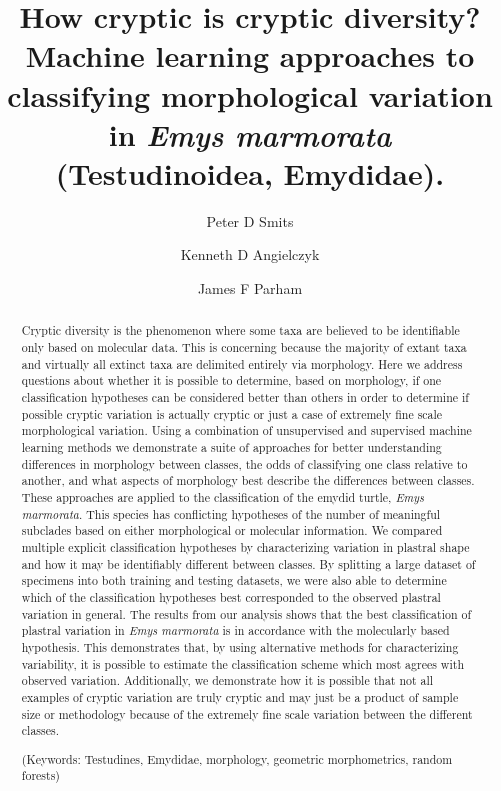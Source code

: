 \documentclass[12pt,letterpaper]{article}\usepackage{graphicx, color}
\title{How cryptic is cryptic diversity? Machine learning approaches to classifying morphological variation in \textit{Emys marmorata} (Testudinoidea, Emydidae).}
\author[1]{Peter D Smits}%
\author[1,2]{Kenneth D Angielczyk}%
\author[3]{James F Parham}%
\affil[1]{Committee on Evolutionary Biology, University of Chicago}
\affil[2]{Integrative Research Center, Field Museum of Natural History}
\affil[3]{Department of Geological Sciences, California State University -- Fullerton}
\begin{document}
\maketitle
{}

\linenumbers
\modulolinenumbers[2]

\begin{abstract}
  Cryptic diversity is the phenomenon where some taxa are believed to be identifiable only based on molecular data. This is concerning because the majority of extant taxa and virtually all extinct taxa are delimited entirely via morphology. Here we address questions about whether it is possible to determine, based on morphology, if one classification hypotheses can be considered better than others in order to determine if possible cryptic variation is actually cryptic or just a case of extremely fine scale morphological variation. %
  Using a combination of unsupervised and supervised machine learning methods we demonstrate a suite of approaches for better understanding differences in morphology between classes, the odds of classifying one class relative to another, and what aspects of morphology best describe the differences between classes.
  These approaches are applied to the classification of the emydid turtle, \textit{Emys marmorata}. This species has conflicting hypotheses of the number of meaningful subclades based on either morphological or molecular information. We compared multiple explicit classification hypotheses by characterizing variation in plastral shape and how it may be identifiably different between classes. By splitting a large dataset of specimens into both training and testing datasets, we were also able to determine which of the classification hypotheses best corresponded to the observed plastral variation in general.
  The results from our analysis shows that the best classification of plastral variation in \textit{Emys marmorata} is in accordance with the molecularly based hypothesis. This demonstrates that, by using alternative methods for characterizing variability, it is possible to estimate the classification scheme which most agrees with observed variation. Additionally, we demonstrate how it is possible that not all examples of cryptic variation are truly cryptic and may just be a product of sample size or methodology because of the extremely fine scale variation between the different classes.
 
\noindent (Keywords: Testudines, Emydidae, morphology, geometric morphometrics, random forests)
\end{abstract}
\end{document}
